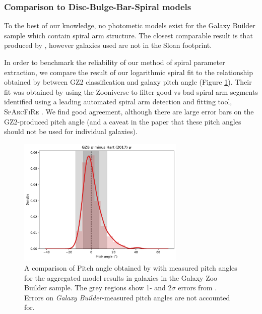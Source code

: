 \documentclass[../main.tex]{subfiles}
\begin{document}
\subsubsection{Comparison to Disc-Bulge-Bar-Spiral models}
To the best of our knowledge, no photometic models exist for the Galaxy Builder sample which contain spiral arm structure. The closest comparable result is that produced by \citet{Gao2017:1709.00746v1}, however galaxies used are not in the Sloan footprint.

In order to benchmark the reliability of our method of spiral parameter extraction, we compare the result of our logarithmic spiral fit to the relationship obtained by \citet{Hart2016:1607.01019v1} between GZ2 classification and galaxy pitch angle (Figure \ref{fig:hart_pitch_angle}). Their fit was obtained by using the Zooniverse to filter good vs bad spiral arm segments identified using a leading automated spiral arm detection and fitting tool, \textsc{SpArcFiRe} \citep{Davis2014:1402.1910v1}. We find good agreement, although there are large error bars on the GZ2-produced pitch angle (and a caveat in the paper that these pitch angles should not be used for individual galaxies).

\begin{figure}
  \includegraphics[width=8cm]{images__results/gzb-hart-comparison.pdf}
  \caption{A comparison of Pitch angle obtained by \citet{Hart2016:1607.01019v1} with measured pitch angles for the aggregated model results in galaxies in the Galaxy Zoo Builder sample. The grey regions show 1- and $2\sigma$ errors from \citet{Hart2016:1607.01019v1}. Errors on \textit{Galaxy Builder}-measured pitch angles are not accounted for.}
  \label{fig:hart_pitch_angle}
\end{figure}
\end{document}
